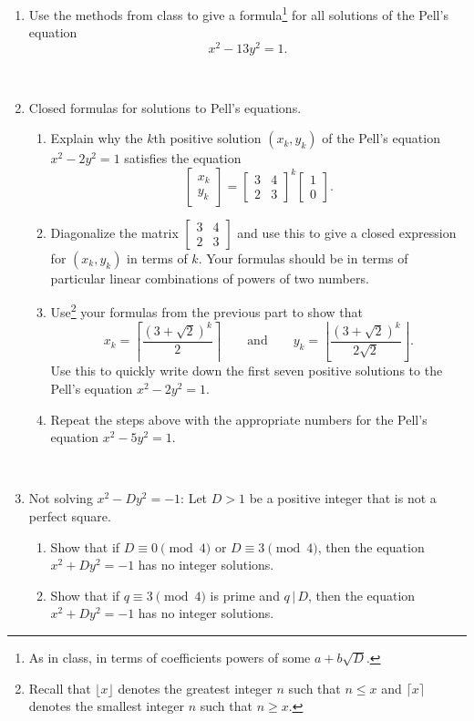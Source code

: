 \documentclass{amsart}
\begin{document}
\begin{enumerate}

\item Use the methods from class to give a formula\footnote{As in class, in terms of coefficients powers of some $a+b\sqrt{D}$.} for all solutions of the Pell's equation
\[ x^2 - 13 y^2 = 1.\]

\

\item Closed formulas for solutions to Pell's equations.
\begin{enumerate}
\item Explain why the $k$th positive solution $(x_k,y_k)$ of the Pell's equation $x^2 - 2y^2=1$ satisfies the equation
\[ \begin{bmatrix} x_k \\ y_k \end{bmatrix} = \begin{bmatrix} 3 & 4 \\ 2 & 3\end{bmatrix}^k \begin{bmatrix} 1 \\ 0\end{bmatrix}.\]
\item Diagonalize the matrix $\begin{bmatrix} 3 & 4 \\ 2 & 3\end{bmatrix}$ and use this to give a closed expression for $(x_k,y_k)$ in terms of $k$. Your formulas should be in terms of particular linear combinations of powers of two numbers.
\item Use\footnote{Recall that $\lfloor x \rfloor$ denotes the greatest integer $n$ such that $n\leq x$ and $\lceil x \rceil$ denotes the smallest integer $n$ such that $n\geq x$.} your formulas from the previous part to show that 
\[ x_k =\left\lceil \frac{(3+\sqrt{2})^k}{2} \right\rceil \qquad\text{and}\qquad y_k =\left\lfloor \frac{(3+\sqrt{2})^k}{2\sqrt{2}} \right\rfloor.\]
Use this to quickly write down the first seven positive solutions to the Pell's equation $x^2 - 2y^2=1$.
\item Repeat the steps above with the appropriate numbers for the Pell's equation $x^2 - 5y^2=1$.
\end{enumerate}


\

\item Not solving $x^2 - D y^2 = -1$: Let $D>1$ be a positive integer that is not a perfect square.
\begin{enumerate}
\item Show that if $D\equiv 0 \pmod{4}$ or $D\equiv 3 \pmod{4}$, then the equation $x^2 + Dy^2 = -1$ has no integer solutions.
\item Show that if $q\equiv 3 \pmod{4}$ is prime and $q\,|\,D$, then the equation $x^2 + Dy^2 = -1$ has no integer solutions.
\end{enumerate}



\end{enumerate}
\end{document}
